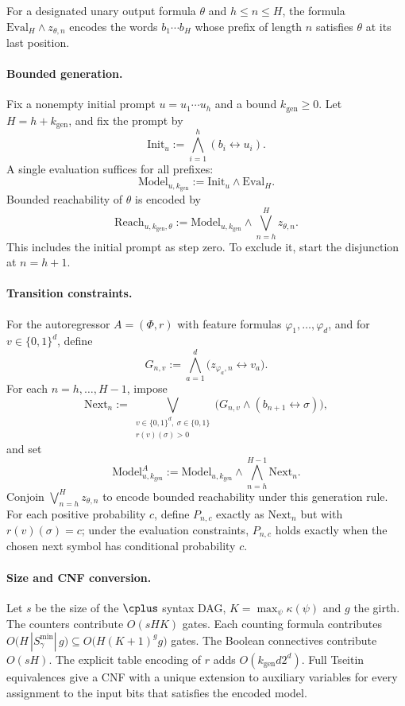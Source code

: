 For a designated unary output formula $\theta$ and $h\leq n\leq H$, the formula
$\mathrm{Eval}_H\land z_{\theta,n}$ encodes the words $b_1\cdots b_H$ whose prefix of length $n$
satisfies $\theta$ at its last position.

\paragraph{Bounded generation.}
Fix a nonempty initial prompt $u=u_1\cdots u_h$ and a bound $k_{\mathrm{gen}}\geq 0$. Let
$H=h+k_{\mathrm{gen}}$, and fix the prompt by
\[
  \mathrm{Init}_u := \bigwedge_{i=1}^{h}(b_i\leftrightarrow u_i).
\]
A single evaluation suffices for all prefixes:
\[
  \mathrm{Model}_{u,k_{\mathrm{gen}}} := \mathrm{Init}_u\land\mathrm{Eval}_H .
\]
Bounded reachability of $\theta$ is encoded by
\[
  \mathrm{Reach}_{u,k_{\mathrm{gen}},\theta} :=
  \mathrm{Model}_{u,k_{\mathrm{gen}}}\land\bigvee_{n=h}^{H} z_{\theta,n}.
\]
This includes the initial prompt as step zero. To exclude it, start the disjunction at $n=h+1$.

\paragraph{Transition constraints.}
For the autoregressor $A=(\Phi,r)$ with feature formulas $\varphi_1,\ldots,\varphi_d$, and for
$v\in\{0,1\}^d$, define
\[
  G_{n,v} := \bigwedge_{a=1}^{d}\bigl(z_{\varphi_a,n}\leftrightarrow v_a\bigr).
\]
For each $n=h,\ldots,H-1$, impose
\[
  \mathrm{Next}_n := \bigvee_{\substack{v\in\{0,1\}^d,\ \sigma\in\{0,1\}\\ r(v)(\sigma)>0}}
  \bigl(G_{n,v}\land(b_{n+1}\leftrightarrow\sigma)\bigr),
\]
and set
\[
  \mathrm{Model}^{A}_{u,k_{\mathrm{gen}}} := \mathrm{Model}_{u,k_{\mathrm{gen}}}\land\bigwedge_{n=h}^{H-1}\mathrm{Next}_n .
\]
Conjoin $\bigvee_{n=h}^{H} z_{\theta,n}$ to encode bounded reachability under this generation
rule. For each positive probability $c$, define $P_{n,c}$ exactly as $\mathrm{Next}_n$ but with
$r(v)(\sigma)=c$; under the evaluation constraints, $P_{n,c}$ holds exactly when the chosen next
symbol has conditional probability $c$.

\paragraph{Size and CNF conversion.}
Let $s$ be the size of the $\cplus$ syntax DAG, $K=\max_\psi\kappa(\psi)$ and $g$ the girth.
The counters contribute $O(sHK)$ gates. Each counting formula contributes
$O\bigl(H\,|S^{\min}_\gamma|\,g\bigr)\subseteq O\bigl(H(K+1)^{g}g\bigr)$ gates. The Boolean
connectives contribute $O(sH)$. The explicit table encoding of $r$ adds
$O(k_{\mathrm{gen}}d2^d)$. Full Tseitin equivalences give a CNF with a unique extension to
auxiliary variables for every assignment to the input bits that satisfies the encoded model.
